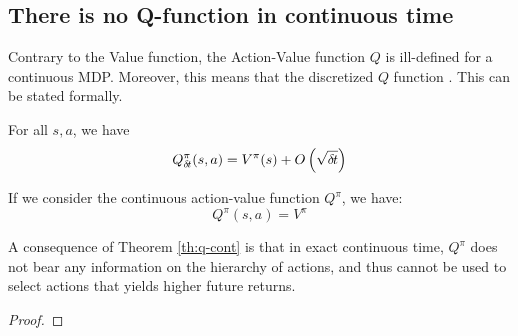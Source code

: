 \subsection{There is no Q-function in continuous time}

Contrary to the Value function, the Action-Value function $Q$ is ill-defined for a continuous MDP. Moreover, this means that the discretized $Q$ function . This can be stated formally.
\begin{theorem}
  For all $s, a$, we have
  \begin{equation}
    \label{eq:q-discr}
    Q^\pi_{\delta\hspace{-.1em}t}(s, a) = V^\pi(s) + O\left(\sqrt{{\delta\hspace{-.1em}t}}\right)
  \end{equation}
  
  If we consider the continuous action-value function $Q^\pi$, we have:
  \begin{equation}
    \label{eq:q-cont}
    Q^\pi(s, a) = V^\pi
  \end{equation}
  \label{th:q-cont}
\end{theorem}

A consequence of Theorem \ref{th:q-cont} is that in exact continuous time,
$Q^\pi$ does not bear any information on the hierarchy of actions, and
thus cannot be used to select actions that yields higher future returns.

\begin{proof}
  \end{proof}
